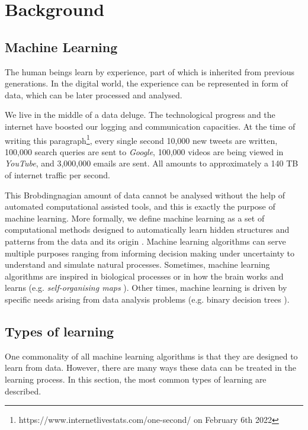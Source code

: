 \chapter{Background} \label{ch:background}
\section{Machine Learning}
The human beings learn by experience, part of which is inherited from previous generations. In the digital world, the experience can be represented in form of data, which can be later processed and analysed.

We live in the middle of a data deluge. The technological progress and the internet have boosted our logging and communication capacities. At the time of writing this paragraph\footnote{https://www.internetlivestats.com/one-second/ on February 6th 2022}, every single second 10,000 new tweets are written, 100,000 search queries are sent to \textit{Google}, 100,000 videos are being viewed in \textit{YouTube}, and 3,000,000 emails are sent. All amounts to approximately a 140 TB of internet traffic per second.

This Brobdingnagian amount of data cannot be analysed without the help of automated computational assisted tools, and this is exactly the purpose of machine learning. More formally, we define machine learning as a set of computational methods designed to automatically learn hidden structures and patterns from the data and its origin \autocite{murphy2012, theodoridis2015}. Machine learning algorithms can serve multiple purposes ranging from informing decision making under uncertainty to understand and simulate natural processes. Sometimes, machine learning algorithms are inspired in biological processes or in how the brain works and learns \autocite{haykin1998} (e.g. \textit{self-organising maps} \autocite{kohonen2001}). Other times, machine learning is driven by specific needs arising from data analysis problems (e.g. binary decision trees \autocite{hastie2009, hastie2014}).

\section{Types of learning}
One commonality of all machine learning algorithms is that they are designed to learn from data. However, there are many ways these data can be treated in the learning process. In this section, the most common types of learning are described.

